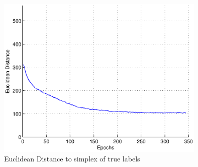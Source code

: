 \documentclass[10pt,twocolumn,letterpaper]{article}
\begin{document}
\begin{figure}[htbp] 
\centering
   \begin{minipage}{10 cm}
   \centering
    \includegraphics[width=10cm]{images/euclidean}
    \end{minipage}
  \caption{Euclidean Distance to simplex of true labels}
  \label{Labelname}
\end{figure}


\nocite{blei02,elkan11,bishop06}



{\small


}
\end{document}
